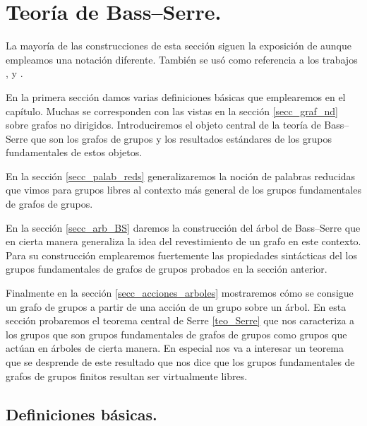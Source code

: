 \documentclass[tesis.tex]{subfiles}
\begin{document}
\chapter{Teoría de Bass--Serre.}\label{cap_BS}

La mayoría de las construcciones de esta sección siguen la exposición de \cite{serre2002trees} aunque empleamos una notación diferente. 
También se usó como referencia a los trabajos \cite{scott1979topological}, \cite{diekert2017context} y \cite{dicks1989groups}.

En la primera sección damos varias definiciones básicas que emplearemos en el capítulo. 
Muchas se corresponden con las vistas en la sección \ref{secc_graf_nd} sobre grafos no dirigidos.
Introduciremos el objeto central de la teoría de Bass--Serre que son los grafos de grupos y los resultados estándares de los grupos fundamentales de estos objetos.

En la sección \ref{secc_palab_reds} generalizaremos la noción de palabras reducidas que vimos para grupos libres al contexto más general de los grupos fundamentales de grafos de grupos.

En la sección \ref{secc_arb_BS} daremos la construcción del árbol de Bass--Serre que en cierta manera generaliza la idea del revestimiento de un grafo en este contexto.
Para su construcción emplearemos fuertemente las propiedades sintácticas del los grupos fundamentales de grafos de grupos probados en la sección anterior.

Finalmente en la sección \ref{secc_acciones_arboles} mostraremos cómo se consigue un grafo de grupos a partir de una acción de un grupo sobre un árbol.
En esta sección probaremos el teorema central de Serre \ref{teo_Serre} que nos caracteriza a los grupos que son grupos fundamentales de grafos de grupos como grupos que actúan en árboles de cierta manera.
En especial nos va a interesar un teorema que se desprende de este resultado que nos dice que los grupos fundamentales de grafos de grupos finitos resultan ser virtualmente libres. 



\section{Definiciones básicas.}\label{secc_defs_basicas}
\end{document}
